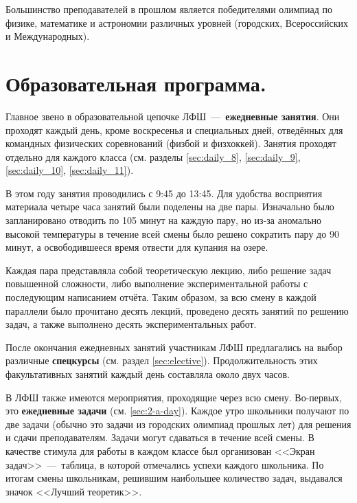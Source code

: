 \documentclass[12pt,a4paper,oneside]{scrartcl}
\newlength{\h}
\newlength{\x}
\begin{document}
\begin{figure}[h]
  \centering
\end{figure}

Большинство преподавателей в прошлом является победителями олимпиад по
физике, математике и астрономии различных уровней (городских,
Всероссийских и Международных).

\clearpage
\section{Образовательная программа.}
\label{sec:science}

Главное звено в образовательной цепочке ЛФШ~---~\textbf{ежедневные
занятия}. Они проходят каждый день, кроме воскресенья и специальных
дней, отведённых для командных физических соревнований (физбой и
физхоккей). Занятия проходят отдельно для каждого класса
(см. разделы \ref{sec:daily_8}, \ref{sec:daily_9}, \ref{sec:daily_10},
\ref{sec:daily_11}). 

\begin{figure}[h]
  \centering
  \hspace{0.05\textwidth}
\end{figure}

В этом году занятия проводились с 9:45 до 13:45. Для удобства
восприятия материала четыре часа занятий были поделены на две
пары. Изначально было запланировано отводить по 105 минут на каждую
пару, но из-за аномально высокой температуры в течение всей смены было
решено сократить пару до 90 минут, а освободившееся время отвести для
купания на озере.

Каждая пара представляла собой теоретическую лекцию, либо решение
задач повышенной сложности, либо выполнение экспериментальной работы с
последующим написанием отчёта. Таким образом, за всю смену в каждой
параллели было прочитано десять лекций, проведено десять занятий по
решению задач, а также выполнено десять экспериментальных работ.

После окончания ежедневных занятий участникам ЛФШ предлагались на
выбор различные \textbf{спецкурсы} (см. раздел
\ref{sec:elective}). Продолжительность этих факультативных занятий
каждый день составляла около двух часов. 

В ЛФШ также имеются мероприятия, проходящие через всю
смену. Во-первых, это \textbf{ежедневные задачи}
(см. \ref{sec:2-a-day}). Каждое утро школьники получают по две задачи
(обычно это задачи из городских олимпиад прошлых лет) для решения и
сдачи преподавателям. Задачи могут сдаваться в течение всей смены. В
качестве стимула для работы в каждом классе был организован <<Экран
задач>>~---~таблица, в которой отмечались успехи каждого школьника. По
итогам смены школьникам, решившим наибольшее количество задач,
выдавался значок <<Лучший теоретик>>.
\end{document}
